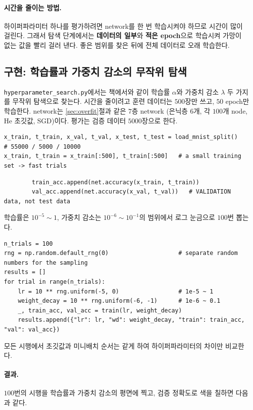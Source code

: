 \documentclass[11pt,a4paper]{article}
\begin{document}
\paragraph{시간을 줄이는 방법.}
하이퍼파라미터 하나를 평가하려면 network를 한 번 학습시켜야 하므로 시간이 많이 걸린다.
그래서 탐색 단계에서는 \textbf{데이터의 일부}와 \textbf{적은 epoch}으로 학습시켜
가망이 없는 값을 빨리 걸러 낸다. 좋은 범위를 찾은 뒤에 전체 데이터로 오래 학습한다.

\subsection{구현: 학습률과 가중치 감소의 무작위 탐색}\label{sec:hpocode}

\texttt{hyperparameter\_search.py}에서는 책에서와 같이 학습률 $\alpha$와 가중치 감소 $\lambda$ 두 가지를 무작위 탐색으로 찾는다.
시간을 줄이려고 훈련 데이터는 $500$장만 쓰고, $50$ epoch만 학습한다.
network는 \ref{sec:overfit}절과 같은 $7$층 network (은닉층 $6$개, 각 $100$개 node, He 초깃값, SGD)이다.
평가는 검증 데이터 $5000$장으로 한다.
\begin{lstlisting}
x_train, t_train, x_val, t_val, x_test, t_test = load_mnist_split()   # 55000 / 5000 / 10000
x_train, t_train = x_train[:500], t_train[:500]   # a small training set -> fast trials
\end{lstlisting}
\begin{lstlisting}
        train_acc.append(net.accuracy(x_train, t_train))
        val_acc.append(net.accuracy(x_val, t_val))   # VALIDATION data, not test data
\end{lstlisting}
학습률은 $10^{-5}\sim1$, 가중치 감소는 $10^{-6}\sim10^{-1}$의 범위에서 로그 눈금으로 $100$번 뽑는다.
\begin{lstlisting}
n_trials = 100
rng = np.random.default_rng(0)                    # separate random numbers for the sampling
results = []
for trial in range(n_trials):
    lr = 10 ** rng.uniform(-5, 0)                 # 1e-5 ~ 1
    weight_decay = 10 ** rng.uniform(-6, -1)      # 1e-6 ~ 0.1
    _, train_acc, val_acc = train(lr, weight_decay)
    results.append({"lr": lr, "wd": weight_decay, "train": train_acc, "val": val_acc})
\end{lstlisting}
모든 시행에서 초깃값과 미니배치 순서는 같게 하여 하이퍼파라미터의 차이만 비교한다.

\paragraph{결과.}
$100$번의 시행을 학습률과 가중치 감소의 평면에 찍고, 검증 정확도로 색을 칠하면 다음과 같다.
\end{document}
